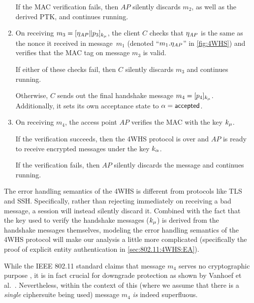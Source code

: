 \begin{enumerate}
	 

	If the MAC verification fails,
	then $AP$ silently discards $m_2$,
	as well as the derived PTK,  
	and continues running.
	
	\item 
	On receiving $m_3 = [\eta_{AP} \| p_3]_{k_{\mu}}$, 
	the client $C$  checks that $\eta_{AP}$ is the same as the nonce it received in message~$m_1$ 
	(denoted ``$m_1.\eta_{AP}$'' in \cref{fig:4WHS})
	and verifies that the MAC tag on message $m_3$ is valid.

	If either of these checks fail,
	then $C$ silently discards $m_3$ and continues running.

	Otherwise,
	$C$ sends out the final handshake message $m_4 = [p_4]_{k_\mu}$.
	Additionally,
	it sets its own acceptance state to $\alpha = \mathsf{accepted}$. 
	

	
	\item On receiving $m_4$, the access point $AP$ verifies the MAC with the key $k_\mu$.

	If the verification succeeds,
	then the 4WHS protocol is over and $AP$ is ready to receive encrypted messages under the key $k_\alpha$.

	If the verification fails,
	then $AP$ silently discards the message and continues running.

\end{enumerate}





\begin{remark}
The error handling semantics of the 4WHS is different from protocols like TLS and SSH.
Specifically,
rather than rejecting immediately on receiving a bad message,
a session will instead silently discard it.
Combined with the fact that the key used to verify the handshake messages ($k_{\mu}$)
is derived from the handshake messages themselves,
modeling the error handling semantics of the 4WHS protocol will make our analysis a little more complicated
(specifically the proof of explicit entity authentication in \cref{sec:802.11:4WHS:EA}).
\end{remark}

\begin{remark}
While the IEEE 802.11 standard claims that message $m_4$ serves no cryptographic purpose \cite[§11.6.6.8.4]{IEEE:2012:802.11},
it is in fact crucial for downgrade protection as shown by Vanhoef et al.~\cite{ASIACCS:VanSchPie17}.
Nevertheless,
within the context of this 
(where we assume that there is a \emph{single} ciphersuite being used)
message $m_4$ \emph{is} indeed superfluous.
\end{remark}







